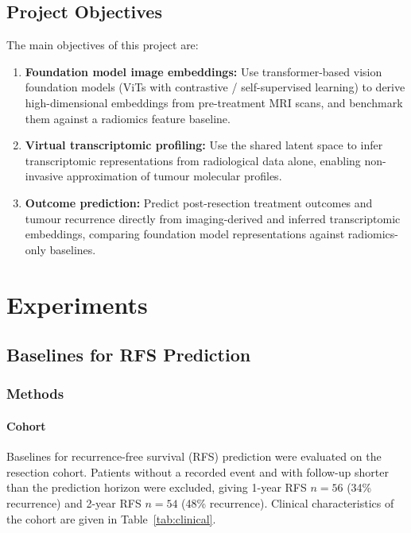 \documentclass[12pt,twoside]{report}
\begin{document}
\section{Project Objectives}

The main objectives of this project are:
\begin{enumerate}
    \item \textbf{Foundation model image embeddings:} Use transformer-based vision foundation models
    (ViTs with contrastive / self-supervised learning) to derive high-dimensional embeddings from
    pre-treatment MRI scans, and benchmark them against a radiomics feature baseline.

    \item \textbf{Virtual transcriptomic profiling:} Use the shared latent space to infer
    transcriptomic representations from radiological data alone, enabling non-invasive approximation
    of tumour molecular profiles.

    \item \textbf{Outcome prediction:} Predict post-resection treatment outcomes and tumour recurrence
    directly from imaging-derived and inferred transcriptomic embeddings, comparing foundation model
    representations against radiomics-only baselines.
\end{enumerate}

\chapter{Experiments}

\section{Baselines for RFS Prediction}

\subsection*{Methods}

\subsubsection*{Cohort}

Baselines for recurrence-free survival (RFS) prediction were evaluated on the resection cohort.
Patients without a recorded event and with follow-up shorter than the prediction horizon were excluded,
giving 1-year RFS $n=56$ (34\% recurrence) and 2-year RFS $n=54$ (48\% recurrence). Clinical characteristics of the cohort are given in Table~\ref{tab:clinical}.
\end{document}
